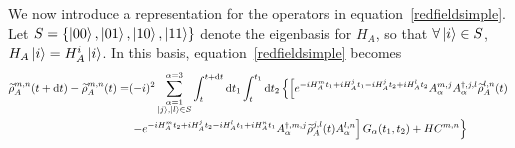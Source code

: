\documentclass[aps, prl, preprint]{revtex4-1}
\newcommand{\til}[1]{\widetilde{#1}}
\begin{document}
We now introduce a representation for the operators in equation~\ref{redfieldsimple}. Let $S = \{\ket{00},\ket{01},\ket{10},\ket{11}\}$ denote the eigenbasis for $H_A$, so that $\forall \ket{i}\in S$, $H_A\ket{i} = H_A^i\ket{i}$. In this basis, equation~\ref{redfieldsimple} becomes
\begin{align}\label{nolube}
\begin{split}
\til{\rho}_A^{m,n}(t+\dd{t}) - \til{\rho}_A^{m,n}(t) = &(-i)^2\sum_{\substack{\alpha=1\\\ket{j},\ket{l}\in S}}^{\alpha=3}\int_t^{t+\dd{t}}\dd{t_1}\int_t^{t_1}\dd{t_2}\left\{\left[e^{-iH_A^mt_1+iH_A^jt_1-iH_A^jt_2+iH_A^lt_2}A_{\alpha}^{m,j}A_{\alpha}^{\dag,j,l}\til{\rho}_A^{l,n}(t)\right.\right.\\
&\left.\left.-e^{-iH_A^mt_2+iH_A^jt_2-iH_A^lt_1+iH_A^nt_1}A_{\alpha}^{\dag,m,j}\til{\rho}_A^{j,l}(t)A_{\alpha}^{l,n}\right]G_{\alpha}(t_1,t_2) + HC^{m,n}\right\}
\end{split}
\end{align}
\end{document}
